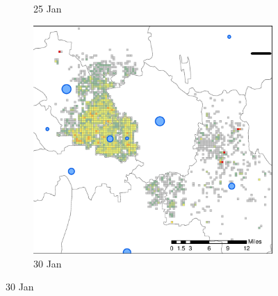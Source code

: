 \documentclass[preprints,ijgi,submit,moreauthors]{Definitions/mdpi}
\begin{document}
\begin{figure}[H]
\begin{subfigure}{.3\textwidth}
        \caption{25 Jan}
    \end{subfigure}
    \begin{subfigure}{.3\textwidth}
        \includegraphics[width=\textwidth]{Figures/Relation_with_confrimed_cases/NewDistrictSSBD2020_01_30.eps}
        \caption{30 Jan}
    \end{subfigure}


\end{figure}
\end{document}

